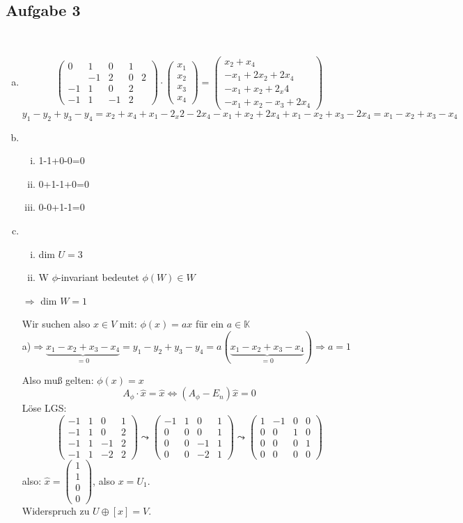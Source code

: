 \documentclass[a4paper,twoside,DIV15,BCOR12mm]{scrbook}
\newcommand{\enur}{\ \begin{enumerate}[(i)]}
\newcommand{\enua}{\ \begin{enumerate}[a)]}
\newcommand{\une}{\end{enumerate}}
\renewcommand{\K}{\ensuremath{\mathbb{K}}}
\newcommand{\RA}{\Rightarrow}
\newcommand{\LRA}{\Leftrightarrow}
\newcommand{\x}{\cdot}
\providecommand{\matr}[1]{\begin{pmatrix}#1\end{pmatrix}}
\begin{document}
\subsection {Aufgabe 3}
\enua
\item
\[\matr{0&1&0&1\\&-1&2&0&2\\-1&1&0&2\\-1&1&-1&2}\x\matr{x_1\\x_2\\x_3\\x_4}=\matr{x_2+x_4\\-x_1+2x_2+2x_4\\-x_1+x_2+2_x4\\-x_1+x_2-x_3+2x_4}\]
\[y_1-y_2+y_3-y_4=x_2+x_4+x_1-2_x2-2x_4-x_1+x_2+2x_4+x_1-x_2+x_3-2x_4=x_1-x_2+x_3-x_4\]
\item
\enur
\item 1-1+0-0=0
\item 0+1-1+0=0
\item 0-0+1-1=0
\une
\item
\enur
\item dim $U=3$
\item W $\phi$-invariant bedeutet $\phi(W)\in W$
\une
$\RA$ dim $W=1$\par
Wir suchen also $x\in V$ mit: $\phi(x)=ax$ für ein $a\in\K$\\
a)$\RA\underbrace{x_1-x_2+x_3-x_4}_{=0}=y_1-y_2+y_3-y_4=a(\underbrace{x_1-x_2+x_3-x_4}_{=0})\RA a=1$\par
Also muß gelten: $\phi(x)=x$
\[A_\phi\x\hat{x}=\hat{x}\LRA(A_\phi-E_n)\hat{x}=0\]
Löse LGS:
\[\matr{-1&1&0&1\\-1&1&0&2\\-1&1&-1&2\\-1&1&-2&2}\leadsto\matr{-1&1&0&1\\0&0&0&1\\0&0&-1&1\\0&0&-2&1}\leadsto\matr{1&-1&0&0\\0&0&1&0\\0&0&0&1\\0&0&0&0}\]
also: $\hat{x}=\matr{1\\1\\0\\0}$, also $x=U_1$.\\
Widerspruch zu $U\oplus[x]=V$.
\une
\end{document}
